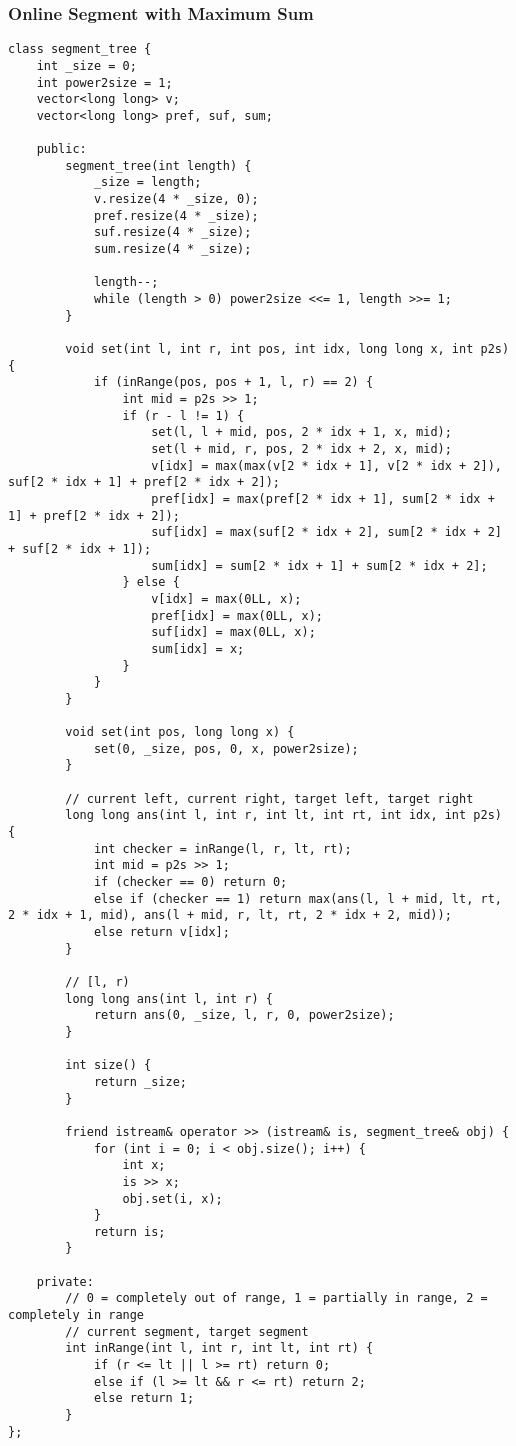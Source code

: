 \subsubsection{Online Segment with Maximum Sum}
\begin{lstlisting}
class segment_tree {
    int _size = 0;
    int power2size = 1;
    vector<long long> v;
    vector<long long> pref, suf, sum;
 
    public:
        segment_tree(int length) {
            _size = length;
            v.resize(4 * _size, 0);
            pref.resize(4 * _size);
            suf.resize(4 * _size);
            sum.resize(4 * _size);
 
            length--;
            while (length > 0) power2size <<= 1, length >>= 1;
        }
 
        void set(int l, int r, int pos, int idx, long long x, int p2s) {
            if (inRange(pos, pos + 1, l, r) == 2) {
                int mid = p2s >> 1;
                if (r - l != 1) {
                    set(l, l + mid, pos, 2 * idx + 1, x, mid);
                    set(l + mid, r, pos, 2 * idx + 2, x, mid);
                    v[idx] = max(max(v[2 * idx + 1], v[2 * idx + 2]), suf[2 * idx + 1] + pref[2 * idx + 2]);
                    pref[idx] = max(pref[2 * idx + 1], sum[2 * idx + 1] + pref[2 * idx + 2]);
                    suf[idx] = max(suf[2 * idx + 2], sum[2 * idx + 2] + suf[2 * idx + 1]);
                    sum[idx] = sum[2 * idx + 1] + sum[2 * idx + 2];
                } else {
                    v[idx] = max(0LL, x);
                    pref[idx] = max(0LL, x);
                    suf[idx] = max(0LL, x);
                    sum[idx] = x;
                }
            }
        }
 
        void set(int pos, long long x) {
            set(0, _size, pos, 0, x, power2size);
        }
 
        // current left, current right, target left, target right
        long long ans(int l, int r, int lt, int rt, int idx, int p2s) {
            int checker = inRange(l, r, lt, rt);
            int mid = p2s >> 1;
            if (checker == 0) return 0;
            else if (checker == 1) return max(ans(l, l + mid, lt, rt, 2 * idx + 1, mid), ans(l + mid, r, lt, rt, 2 * idx + 2, mid));
            else return v[idx];
        }
 
        // [l, r)
        long long ans(int l, int r) {
            return ans(0, _size, l, r, 0, power2size);
        }
        
        int size() {
            return _size;
        }
        
        friend istream& operator >> (istream& is, segment_tree& obj) {
            for (int i = 0; i < obj.size(); i++) {
                int x;
                is >> x;
                obj.set(i, x);
            }
            return is;
        }
 
    private:
        // 0 = completely out of range, 1 = partially in range, 2 = completely in range
        // current segment, target segment
        int inRange(int l, int r, int lt, int rt) {
            if (r <= lt || l >= rt) return 0;
            else if (l >= lt && r <= rt) return 2;
            else return 1;
        }
};
\end{lstlisting}

